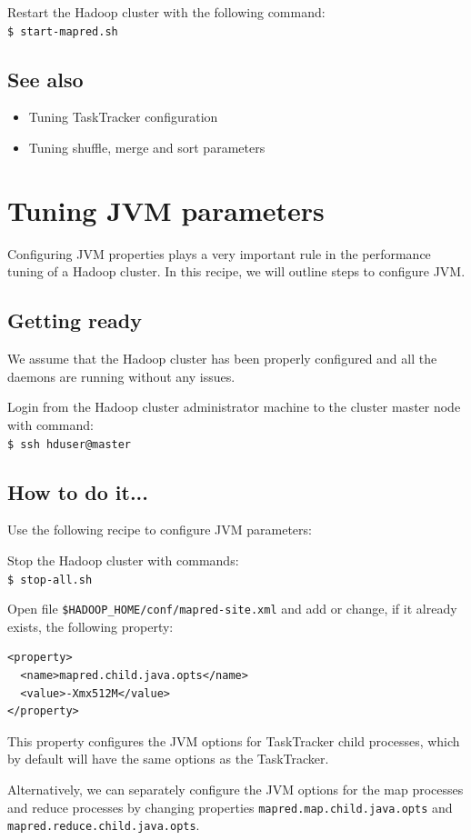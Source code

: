 Restart the Hadoop cluster with the following command: \\
\verb|$ start-mapred.sh|

\subsection*{See also}
\begin{itemize}
  \item Tuning TaskTracker configuration
  \item Tuning shuffle, merge and sort parameters
\end{itemize}

\section{Tuning JVM parameters}
Configuring JVM properties plays a very important rule in the performance tuning of a Hadoop cluster. In this recipe, we will outline steps to configure JVM.
\subsection*{Getting ready}
We assume that the Hadoop cluster has been properly configured and all the daemons are running without any issues.

Login from the Hadoop cluster administrator machine to the cluster master node with command: \\
\verb|$ ssh hduser@master|
\subsection*{How to do it...}
Use the following recipe to configure JVM parameters:

Stop the Hadoop cluster with commands: \\
\verb|$ stop-all.sh|

Open file \verb|$HADOOP_HOME/conf/mapred-site.xml| and add or change, if it already exists, the following property:
\lstset{style=bashstyle}
\begin{lstlisting}
<property>
  <name>mapred.child.java.opts</name>
  <value>-Xmx512M</value>
</property>
\end{lstlisting}

This property configures the JVM options for TaskTracker child processes, which by default will have the same options as the TaskTracker.

Alternatively, we can separately configure the JVM options for the map processes and reduce processes by changing properties \verb|mapred.map.child.java.opts| and \verb|mapred.reduce.child.java.opts|.

